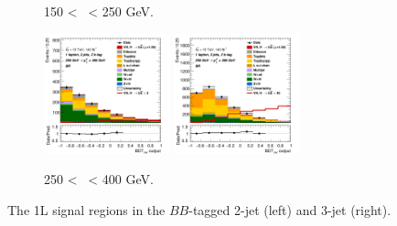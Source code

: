 \begin{figure}[h!]
\begin{subfigure}[b]{\textwidth}
        \caption{150 < \ptv\ < 250 GeV.}
        \label{fig:plots_VHbb_1L_150_SR}
    \end{subfigure}
    \begin{subfigure}[b]{\textwidth}
        \centering
        \includegraphics[width=0.40\textwidth]{Images/VH/Own_fit/prefit_VHbb/Region_distmva_BMax400_BMin250_DSR_J2_TTypebb_T2_L1_Y6051_Prefit.png}
        \includegraphics[width=0.40\textwidth]{Images/VH/Own_fit/prefit_VHbb/Region_distmva_BMax400_BMin250_DSR_J3_TTypebb_T2_L1_Y6051_Prefit.png}
        \caption{250 < \ptv\ < 400 GeV.}
        \label{fig:plots_VHbb_1L_250_SR}
    \end{subfigure}
    \caption{The 1L signal regions in the $BB$-tagged 2-jet (left) and 3-jet (right).}
    \label{fig:plots_VHbb_1L_SR}
\end{figure} 

\vspace*{\fill} \clearpage
\vspace*{\fill}

